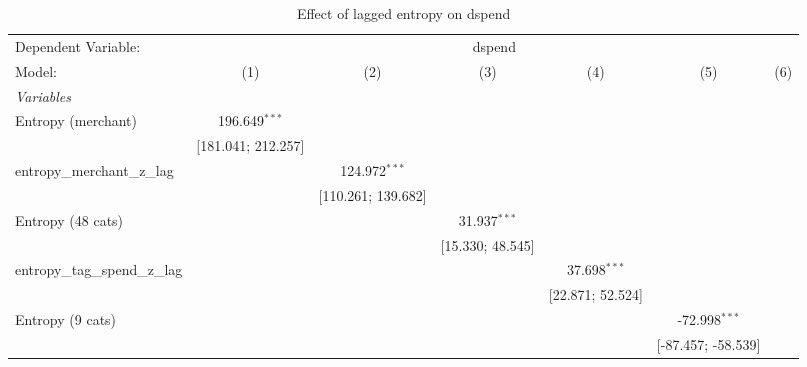 
\begin{table}[htbp]
   \centering
   \tiny
   \begin{threeparttable}[b]
      \caption{\label{tab:reg_dspend_lagged_z} Effect of lagged entropy on dspend}
      \begin{tabular}{lcccccc}
         \tabularnewline \midrule \midrule
         Dependent Variable: & \multicolumn{6}{c}{dspend}\\
         Model:                          & (1)                & (2)                & (3)                & (4)                & (5)                & (6)\\  
         \midrule
         \emph{Variables}\\
         Entropy (merchant)              & 196.649$^{***}$    &                    &                    &                    &                    &   \\   
                                         & [181.041; 212.257] &                    &                    &                    &                    &   \\   
         entropy\_merchant\_z\_lag       &                    & 124.972$^{***}$    &                    &                    &                    &   \\   
                                         &                    & [110.261; 139.682] &                    &                    &                    &   \\   
         Entropy (48 cats)               &                    &                    & 31.937$^{***}$     &                    &                    &   \\   
                                         &                    &                    & [15.330; 48.545]   &                    &                    &   \\   
         entropy\_tag\_spend\_z\_lag     &                    &                    &                    & 37.698$^{***}$     &                    &   \\   
                                         &                    &                    &                    & [22.871; 52.524]   &                    &   \\   
         Entropy (9 cats)                &                    &                    &                    &                    & -72.998$^{***}$    &   \\   
                                         &                    &                    &                    &                    & [-87.457; -58.539] &   \\   

\end{tabular}
\end{threeparttable}
\end{table}
